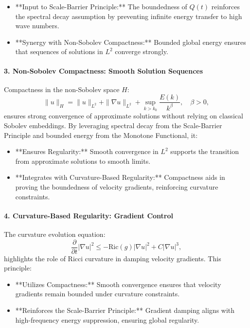 \documentclass[12pt]{article}
\theoremstyle{definition}
\begin{document}
\begin{itemize}
    \item **Input to Scale-Barrier Principle:** The boundedness of $Q(t)$ reinforces the spectral decay assumption by preventing infinite energy transfer to high wave numbers.
    \item **Synergy with Non-Sobolev Compactness:** Bounded global energy ensures that sequences of solutions in $L^2$ converge strongly.
\end{itemize}

\paragraph{3. Non-Sobolev Compactness: Smooth Solution Sequences}
Compactness in the non-Sobolev space $H$:
\begin{equation}
\|u\|_H = \|u\|_{L^2} + \|\nabla u\|_{L^2} + \sup_{k > k_0} \frac{E(k)}{k^\beta}, \quad \beta > 0,
\end{equation}
ensures strong convergence of approximate solutions without relying on classical Sobolev embeddings. By leveraging spectral decay from the Scale-Barrier Principle and bounded energy from the Monotone Functional, it:
\begin{itemize}
    \item **Ensures Regularity:** Smooth convergence in $L^2$ supports the transition from approximate solutions to smooth limits.
    \item **Integrates with Curvature-Based Regularity:** Compactness aids in proving the boundedness of velocity gradients, reinforcing curvature constraints.
\end{itemize}

\paragraph{4. Curvature-Based Regularity: Gradient Control}
The curvature evolution equation:
\begin{equation}
\frac{\partial}{\partial t} |\nabla u|^2 \leq -\text{Ric}(g)|\nabla u|^2 + C|\nabla u|^3,
\end{equation}
highlights the role of Ricci curvature in damping velocity gradients. This principle:
\begin{itemize}
    \item **Utilizes Compactness:** Smooth convergence ensures that velocity gradients remain bounded under curvature constraints.
    \item **Reinforces the Scale-Barrier Principle:** Gradient damping aligns with high-frequency energy suppression, ensuring global regularity.
\end{itemize}
\end{document}
